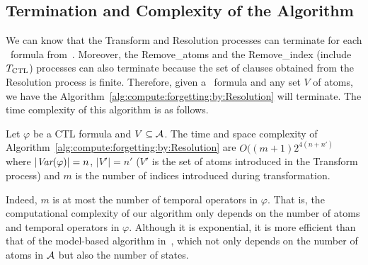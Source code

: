 \documentclass[letterpaper]{article}
\begin{document}
\subsection{Termination and Complexity of the Algorithm}





We can know that the Transform and Resolution processes can terminate for each \CTL\ formula from~\cite{zhang2009refined}. Moreover, the Remove\_atoms and the Remove\_index (include $T_{\textrm{CTL}}$) processes can also terminate because the set of clauses obtained from the Resolution process is finite. Therefore, given a \CTL\ formula and any set $V$ of atoms, we have the Algorithm~\ref{alg:compute:forgetting:by:Resolution} will terminate. 
The time complexity of this algorithm is as follows.


\begin{proposition}\label{pro:complexity}
Let $\varphi$ be a CTL formula and $V \subseteq {\cal A}$.
The time and space complexity of Algorithm~\ref{alg:compute:forgetting:by:Resolution} are $O((m+1)2^{4(n+n')}$ where $|\textit{Var}(\varphi)|=n$, $|V'|=n'$ ($V'$ is the set of atoms introduced in the Transform process) and $m$ is the number of indices introduced during transformation.
\end{proposition}

Indeed, $m$ is at most the number of  temporal  operators in $\varphi$.
That is, the computational complexity of our algorithm only depends on the number of atoms and temporal operators in $\varphi$. 
Although it is exponential, it is more efficient than that of the model-based algorithm in~\cite{renyansfirstpaper}, which not only depends on the number of atoms in ${\cal A}$ but also the number of states.
\end{document}
